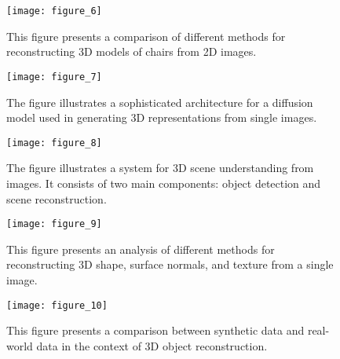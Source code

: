 \documentclass[10pt,journal,compsoc]{IEEEtran}
\begin{document}
\begin{figure}[htbp]
    \centering
    \texttt{[image: figure\_6]}
    \caption{This figure presents a comparison of different methods for reconstructing 3D models of chairs from 2D images.}
    \label{fig:figure_6}
\end{figure}

\begin{figure}[htbp]
    \centering
    \texttt{[image: figure\_7]}
    \caption{The figure illustrates a sophisticated architecture for a diffusion model used in generating 3D representations from single images.}
    \label{fig:figure_7}
\end{figure}

\begin{figure}[htbp]
    \centering
    \texttt{[image: figure\_8]}
    \caption{The figure illustrates a system for 3D scene understanding from images. It consists of two main components: object detection and scene reconstruction.}
    \label{fig:figure_8}
\end{figure}

\begin{figure}[htbp]
    \centering
    \texttt{[image: figure\_9]}
    \caption{This figure presents an analysis of different methods for reconstructing 3D shape, surface normals, and texture from a single image.}
    \label{fig:figure_9}
\end{figure}

\begin{figure}[htbp]
    \centering
    \texttt{[image: figure\_10]}
    \caption{This figure presents a comparison between synthetic data and real-world data in the context of 3D object reconstruction.}
    \label{fig:figure_10}
\end{figure}


\end{document}

